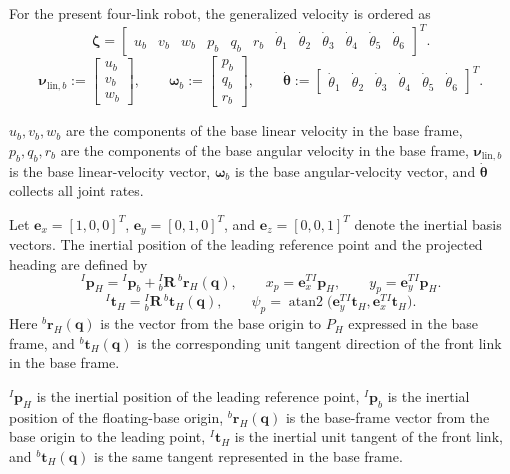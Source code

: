 \documentclass[12pt,a4paper]{report}
\newcommand{\newsymbols}[1]{\par\noindent{}#1\par\vspace{0.35em}}
\begin{document}
For the present four-link robot, the generalized velocity is ordered as
\begin{equation}
\boldsymbol{\zeta} =
\left[
\begin{array}{cccccccccccc}
u_b &
v_b &
w_b &
p_b &
q_b &
r_b &
\dot{\theta}_{1} &
\dot{\theta}_{2} &
\dot{\theta}_{3} &
\dot{\theta}_{4} &
\dot{\theta}_{5} &
\dot{\theta}_{6}
\end{array}
\right]^{T}.
\end{equation}
\begin{equation}
\boldsymbol{\nu}_{\mathrm{lin},b} :=
\begin{bmatrix}
u_b \\ v_b \\ w_b
\end{bmatrix},
\qquad
\boldsymbol{\omega}_b :=
\begin{bmatrix}
p_b \\ q_b \\ r_b
\end{bmatrix},
\qquad
\dot{\boldsymbol{\theta}} :=
\begin{bmatrix}
\dot{\theta}_{1} & \dot{\theta}_{2} & \dot{\theta}_{3} & \dot{\theta}_{4} & \dot{\theta}_{5} & \dot{\theta}_{6}
\end{bmatrix}^{T}.
\end{equation}
\newsymbols{$u_b,v_b,w_b$ are the components of the base linear velocity in the base frame, $p_b,q_b,r_b$ are the components of the base angular velocity in the base frame, $\boldsymbol{\nu}_{\mathrm{lin},b}$ is the base linear-velocity vector, $\boldsymbol{\omega}_b$ is the base angular-velocity vector, and $\dot{\boldsymbol{\theta}}$ collects all joint rates.}

Let $\mathbf{e}_x = [1,0,0]^T$, $\mathbf{e}_y = [0,1,0]^T$, and $\mathbf{e}_z = [0,0,1]^T$ denote the inertial basis vectors. The inertial position of the leading reference point and the projected heading are defined by
\begin{equation}
{}^{I}\mathbf{p}_H =
{}^{I}\mathbf{p}_b +
{}_{b}^{I}\mathbf{R}\,{}^{b}\mathbf{r}_H(\mathbf{q}),
\qquad
x_p = \mathbf{e}_x^T {}^{I}\mathbf{p}_H,
\qquad
y_p = \mathbf{e}_y^T {}^{I}\mathbf{p}_H.
\end{equation}
\begin{equation}
{}^{I}\mathbf{t}_H =
{}_{b}^{I}\mathbf{R}\,{}^{b}\mathbf{t}_H(\mathbf{q}),
\qquad
\psi_p =
\operatorname{atan2}
\bigl(
\mathbf{e}_y^T {}^{I}\mathbf{t}_H,
\mathbf{e}_x^T {}^{I}\mathbf{t}_H
\bigr).
\end{equation}
Here ${}^{b}\mathbf{r}_H(\mathbf{q})$ is the vector from the base origin to $P_H$ expressed in the base frame, and ${}^{b}\mathbf{t}_H(\mathbf{q})$ is the corresponding unit tangent direction of the front link in the base frame.
\newsymbols{${}^{I}\mathbf{p}_H$ is the inertial position of the leading reference point, ${}^{I}\mathbf{p}_b$ is the inertial position of the floating-base origin, ${}^{b}\mathbf{r}_H(\mathbf{q})$ is the base-frame vector from the base origin to the leading point, ${}^{I}\mathbf{t}_H$ is the inertial unit tangent of the front link, and ${}^{b}\mathbf{t}_H(\mathbf{q})$ is the same tangent represented in the base frame.}
\end{document}
